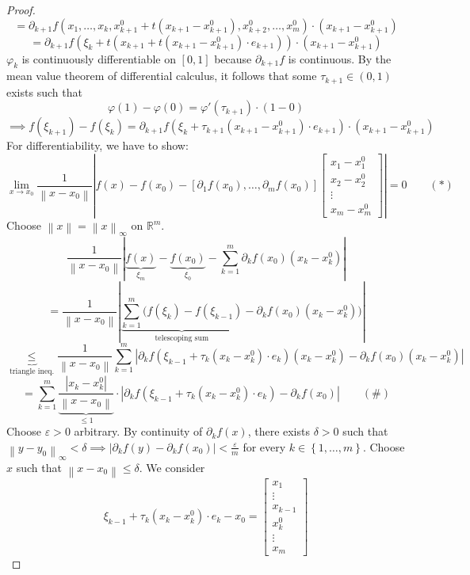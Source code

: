 \documentclass{article}
\newcommand{\set}[1]{\left\{#1\right\}}
\newcommand{\norm}[1]{\left\|#1\right\|}
\newcommand{\card}[1]{\left|#1\right|}
\begin{document}
\begin{proof}
  \[ = \partial_{k+1} f(x_1, \dots, x_k, x_{k+1}^0 + t(x_{k+1} - x_{k+1}^0), x_{k+2}^0, \dots, x_m^0) \cdot (x_{k+1} - x_{k+1}^0) \]
  \[ = \partial_{k+1} f(\xi_k + t(x_{k+1} + t(x_{k+1} - x_{k+1}^0) \cdot e_{k+1})) \cdot (x_{k+1} - x_{k+1}^0) \]
  $\varphi_k$ is continuously differentiable on $[0,1]$ because $\partial_{k+1} f$ is continuous.
  By the mean value theorem of differential calculus, it follows that some $\tau_{k+1} \in (0,1)$ exists such that
  \[ \varphi(1) - \varphi(0) = \varphi'(\tau_{k+1}) \cdot (1 - 0) \]
  \[ \implies f(\xi_{k+1}) - f(\xi_k) = \partial_{k+1} f(\xi_k + \tau_{k+1}(x_{k+1} - x_{k+1}^0) \cdot e_{k+1}) \cdot (x_{k+1} - x_{k+1}^0) \]
  For differentiability, we have to show:
  \[ \lim_{x\to x_0} \frac{1}{\norm{x - x_0}} \card{f(x) - f(x_0) - [\partial_1 f(x_0), \dots, \partial_m f(x_0)] \begin{bmatrix} x_1 - x_1^0 \\ x_2 - x_2^0 \\ \vdots \\ x_m - x_m^0 \end{bmatrix}} = 0 \qquad (*) \]
  Choose $\norm{x} = \norm{x}_{\infty}$ on $\mathbb R^m$.
  \[ \frac{1}{\norm{x - x_0}} \card{\underbrace{f(x)}_{\xi_m} - \underbrace{f(x_0)}_{\xi_0} - \sum_{k=1}^m \partial_k f(x_0) (x_k - x_k^0)} \]
  \[ = \frac{1}{\norm{x - x_0}} \card{\underbrace{\sum_{k=1}^m (f(\xi_k) - f(\xi_{k-1})}_{\text{telescoping sum}} - \partial_k f(x_0) (x_k - x_k^0))} \]
  \[ \underbrace{\leq}_{\text{triangle ineq.}} \frac{1}{\norm{x - x_0}} \sum_{k=1}^m \card{\partial_k f(\xi_{k-1} + \tau_k (x_k - x_k^0) \cdot e_k) (x_k - x_k^0) - \partial_k f(x_0) (x_k - x_k^0)} \]
  \[ = \sum_{k=1}^m \underbrace{\frac{\card{x_k - x_k^0}}{\norm{x - x_0}}}_{\leq 1} \cdot \card{\partial_k f(\xi_{k-1} + \tau_k(x_k - x_k^0) \cdot e_k) - \partial_k f(x_0)} \qquad (\#) \]
  Choose $\varepsilon > 0$ arbitrary. By continuity of $\partial_k f(x)$, there exists $\delta > 0$ such that $\norm{y - y_0}_{\infty} < \delta \implies \card{\partial_k f(y) - \partial_k f(x_0)} < \frac\varepsilon{m}$ for every $k \in \set{1, \dots, m}$.
  Choose $x$ such that $\norm{x - x_0} \leq \delta$. We consider
  \[
    \xi_{k-1} + \tau_k (x_k - x_k^0) \cdot e_k - x_0
    = \begin{bmatrix} x_1 \\ \vdots \\ x_{k-1} \\ x_k^0 \\ \vdots \\ x_m \end{bmatrix}
\]
\end{proof}
\end{document}
